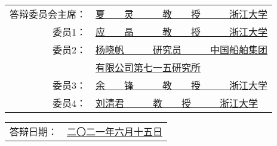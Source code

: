 \vskip 10pt

\begin{center}
    \begin{tabularx}{.75\textwidth}{>{\fangsong}r >{\fangsong}X<{\centering}}
        答辩委员会主席： & \uline{夏~~~~灵~~~~~~教~~~~授~~~~~~浙江大学\hfill} \\
        委员1： &  \uline{应~~~~晶~~~~~~教~~~~授~~~~~~浙江大学\hfill} \\
        委员2： &  \uline{杨晓帆~~~~~~研究员~~~~~~中国船舶集团\hfill} \\
         &  \uline{有限公司第七一五研究所\hfill} \\
        委员3： &  \uline{余~~~~锋~~~~~~教~~~~授~~~~~~浙江大学\hfill} \\
        委员4： &  \uline{刘清君~~~~~~教~~~~授~~~~~~浙江大学\hfill} \\
    \end{tabularx}
\end{center}

\vskip 10pt

\begin{center}
    \begin{tabularx}{.5\textwidth}{>{\fangsong}l >{\fangsong}X<{\centering}}
        答辩日期： & \uline{\hfill 二〇二一年六月十五日 \hfill}
    \end{tabularx}
\end{center}
